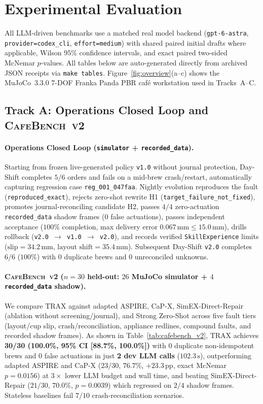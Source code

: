 \documentclass{trax}
\begin{document}
\section{Experimental Evaluation}
\label{sec:experiments}

All LLM-driven benchmarks use a matched real model backend (\texttt{gpt-6-astra}, \texttt{provider=codex\_cli}, \texttt{effort=medium}) with shared paired initial drafts where applicable, Wilson $95\%$ confidence intervals, and exact paired two-sided McNemar $p$-values. All tables below are auto-generated directly from archived JSON receipts via \texttt{make tables}. Figure~\ref{fig:overview}(a--c) shows the MuJoCo~3.3.0 7-DOF Franka Panda PBR caf\'e workstation used in Tracks~A--C.

\subsection{Track A: Operations Closed Loop and \textsc{CafeBench~v2}}
\paragraph{Operations Closed Loop (\texttt{simulator} + \texttt{recorded\_data}).} Starting from frozen live-generated policy \texttt{v1.0} without journal protection, Day-Shift completes $5/6$ orders and fails on a mid-brew crash/restart, automatically capturing regression case \texttt{reg\_001\_047faa}. Nightly evolution reproduces the fault (\texttt{reproduced\_exact}), rejects zero-shot rewrite H1 (\texttt{target\_failure\_not\_fixed}), promotes journal-reconciling candidate H2, passes $4/4$ zero-actuation \texttt{recorded\_data} shadow frames ($0$ false actuations), passes independent acceptance ($100\%$ completion, max delivery error $0.067\,\mathrm{mm} \le 15.0\,\mathrm{mm}$), drills rollback (\texttt{v2.0 $\to$ v1.0 $\to$ v2.0}), and records verified \texttt{SkillExperience} limits ($\text{slip}=34.2\,\mathrm{mm}$, $\text{layout shift}=35.4\,\mathrm{mm}$). Subsequent Day-Shift \texttt{v2.0} completes $6/6$ ($100\%$) with $0$ duplicate brews and $0$ unreconciled unknowns.

\paragraph{\textsc{CafeBench~v2} ($n{=}30$ held-out: $26$ MuJoCo simulator + $4$ \texttt{recorded\_data} shadow).} We compare TRAX against adapted ASPIRE, CaP-X, SimEX-Direct-Repair (ablation without screening/journal), and Strong Zero-Shot across five fault tiers (layout/cup slip, crash/reconciliation, appliance redlines, compound faults, and recorded shadow frames). As shown in Table~\ref{tab:cafebench_v2}, TRAX achieves \textbf{30/30 (100.0\%, 95\% CI [88.7\%, 100.0\%])} with $0$ duplicate non-idempotent brews and $0$ false actuations in just \textbf{2 dev LLM calls} ($102.3\,\mathrm{s}$), outperforming adapted ASPIRE and CaP-X ($23/30$, $76.7\%$, $+23.3\,\mathrm{pp}$, exact McNemar $p{=}0.0156$) at $3\times$ lower LLM budget and wall time, and beating SimEX-Direct-Repair ($21/30$, $70.0\%$, $p{=}0.0039$) which regressed on $2/4$ shadow frames. Stateless baselines fail $7/10$ crash-reconciliation scenarios.
\end{document}
